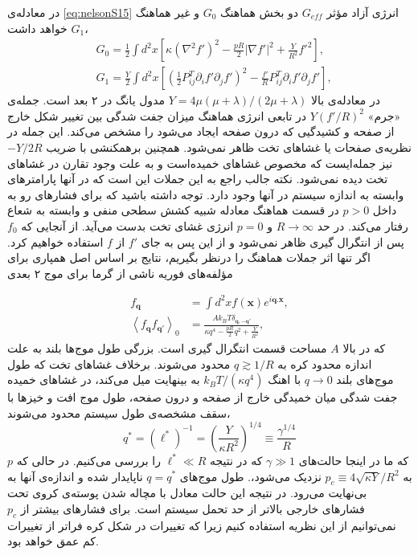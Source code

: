 در معادله‌‌ی \ref{eq:nelsonS15} 
انرژی آزاد مؤثر $G_{eff}$ دو بخش هماهنگ $G_0$ 
و غیر هماهنگ $G_1$
خواهد داشت،
\begin{equation}
\begin{aligned}
&G_0=\frac{1}{2}\int d^2x\left[\kappa(\nabla^2f')^2-\frac{pR}{2}|\nabla f'|^2+\frac{Y}{R^2}f'^2\right], \\
&G_1=\frac{Y}{2}\int d^2x\left[\left(\frac{1}{2}P_{ij}^T\partial_if'\partial_jf'\right)^2-\frac{f'}{R}P_{ij}^T\partial_if'\partial_jf'\right],
\label{eq:nelsonS16.1}
\end{aligned}
\end{equation}
در معادله‌ی بالا $Y=4\mu(\mu+\lambda)/(2\mu+\lambda)$ مدول یانگ در ۲ بعد است. جمله‌ی «جرم» $Y(f'/R)^2$ در تابعی انرژی هماهنگ میزان جفت شدگی بین تغییر شکل خارج از صفحه و کشیدگیی که درون صفحه ایجاد می‌شود را مشخص می‌کند. این جمله در نظریه‌ی صفحات یا غشاهای تخت ظاهر نمی‌شود. همچنین برهمکنشی با ضریب $-Y/2R$ نیز جمله‌ایست که مخصوص غشاهای خمیده‌است و به علت وجود تقارن در غشاهای تخت دیده نمی‌شود. نکته جالب راجع به این جملات این است که در آنها پارامترهای وابسته به اندازه سیستم در آنها وجود دارد. توجه داشته باشید که برای فشارهای رو به داخل $p>0$ در قسمت هماهنگ معادله شبیه کشش سطحی منفی و وابسته به شعاع رفتار می‌کند. در حد $R\rightarrow \infty$ و $p=0$ انرژی غشای تخت بدست می‌آید. از آنجایی که $f_0$ 
پس از انتگرال گیری ظاهر نمی‌شود و از این پس به جای 
$f'$ از 
$f$ 
استفاده خواهیم کرد. اگر تنها اثر جملات هماهنگ را درنظر بگیریم، نتایج بر اساس اصل همپاری برای مؤلفه‌های فوریه ناشی از گرما برای موج ۲ بعدی

\begin{equation}
\begin{aligned}
f_{\boldsymbol q} &= \int d^2xf(\boldsymbol x)e^{i\boldsymbol q.\boldsymbol x}, \\
\left\langle f_{\boldsymbol q}f_{\boldsymbol {q'}}\right\rangle_0 &= \frac{Ak_BT\delta_{\boldsymbol q, \boldsymbol{-q'}}}{\kappa q^4-\frac{pR}{2}q^2+\frac{Y}{R^2}},
\label{eq:nelsonS17}
\end{aligned}
\end{equation}
که در بالا $A$
مساحت قسمت انتگرال گیری است. 
بزرگی طول موج‌ها بلند به علت اندازه محدود کره به $q\gtrsim 1/R$
محدود می‌شوند. برخلاف غشاهای تخت که طول موج‌های بلند $q\rightarrow 0$
با اهنگ $k_BT/(\kappa q^4)$
به بینهایت میل می‌کند، در غشاهای خمیده جفت شدگی میان خمیدگی خارج از صفحه و درون صفحه، طول موج افت و خیزها با سقف مشخصه‌ی طول سیستم محدود می‌شوند، 
\begin{equation}
q^*=(\ell^*)^{-1}=\left(\frac{Y}{\kappa R^2}\right)^{1/4}\equiv\frac{\gamma^{1/4}}{R}
\label{eq:nelsonS17.1}
\end{equation}
که ما در اینجا حالت‌های $\gamma\gg1$
که در نتیجه $\ell^*\ll R$
را بررسی می‌کنیم. در حالی که $p$
به $p_c\equiv4\sqrt{\kappa Y}/R^2$
نزدیک می‌شود،. طول موج‌های $q=q^*$ 
ناپایدار شده و اندازه‌ی آنها به بی‌نهایت می‌رود. در نتیجه این حالت معادل با مچاله شدن پوسته‌ی کروی تحت فشارهای خارجی بالاتر از حد تحمل سیستم است. برای فشارهای بیشتر از $p_c$
نمی‌توانیم از این نظریه استفاده کنیم زیرا که تغییرات در شکل کره فراتر از تغییرات کم عمق خواهد بود.

